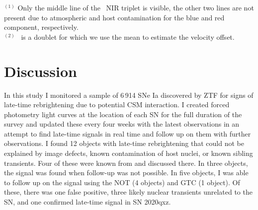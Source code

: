 \documentclass[a4paper,oneside,12pt, class=Latex/Classes/PhDthesisPSnPDF, crop=false]{standalone}
\begin{document}
\begin{table}[]
    \centering
    \caption{Line fits for the emission lines identified in the March 2024 spectrum at the position of SN 2020qxz. The first three columns give the central wavelength and width (in \AA\ and km s$^{-1}$) of the fitted lines. The last three columns give the most likely matched elements and emission lines assuming some amount of blueshift velocity offset given in the last column. The redshift uncertainty contribution to the velocity offset ($120$~km~s$^{-1}$) has not been included. All fits are done in the SN rest frame.}
    \begin{flushleft}
        $^{(1)}$ Only the middle line of the \CaII\ NIR triplet is visible, the other two lines are not present due to atmospheric and host contamination for the blue and red component, respectively.\\
        $^{(2)}$ \KI\ is a doublet for which we use the mean to estimate the velocity offset.
    \end{flushleft}
    \label{fitres_2020qxz}
\end{table}


\section{Discussion}
\label{discussion}
In this study I monitored a sample of 6\,914 SNe Ia discovered by ZTF for signs of late-time rebrightening due to potential CSM interaction. I created forced photometry light curves at the location of each SN for the full duration of the survey and updated these every four weeks with the latest observations in an attempt to find late-time signals in real time and follow up on them with further observations. I found 12 objects with late-time rebrightening that could not be explained by image defects, known contamination of host nuclei, or known sibling transients. Four of these were known from \citet{Terwel_2024_paper1} and discussed there. In three objects, the signal was found when follow-up was not possible. In five objects, I was able to follow up on the signal using the NOT (4 objects) and GTC (1 object). Of these, there was one false positive, three likely nuclear transients unrelated to the SN, and one confirmed late-time signal in SN 2020qxz.
\end{document}
